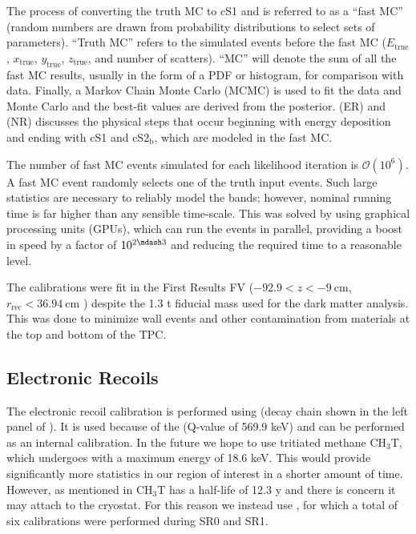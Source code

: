 The process of converting the truth MC to cS1 and \cstwob is referred to as a ``fast MC'' (random numbers are drawn from probability
distributions to select sets of parameters).  ``Truth MC'' refers to the simulated events before the fast MC ($E_{\mathrm{true}}$,
$x_{\mathrm{true}}$, $y_{\mathrm{true}}$, $z_{\mathrm{true}}$, and number
of scatters).  ``MC'' will denote the sum of all the fast MC results, usually in the form of a PDF or histogram, for
comparison with data.  Finally, a Markov Chain Monte Carlo (MCMC) is used to fit the data and Monte Carlo and the best-fit values
are derived from the posterior.   (ER) and
 (NR) discusses the physical steps that occur beginning with energy
deposition and ending with cS1 and $\mathrm{cS2_b}$, which are modeled in the fast MC.

The number of fast MC events simulated for each likelihood iteration is $\mathcal{O}(10^6)$.  A fast MC event randomly selects one of the
truth input events.  Such large statistics are necessary to reliably model the bands;
however, nominal running time is far higher than any sensible time-scale.  This was solved by using graphical processing units (GPUs),
which can run the events in parallel, providing a boost in speed by a factor of $10^{2 \mdash 3}$ and reducing the required time to a
reasonable level.

The calibrations were fit in the First Results FV ($-92.9 < z < -9\ \mathrm{cm}$, $r_{\mathrm{rec}} < 36.94\ \mathrm{cm}$
) despite the 1.3 t fiducial mass used for the dark matter analysis.  This was done to
minimize wall events and other contamination from materials at the top and bottom of the TPC.



\subsection{Electronic Recoils}
\label{subsec:er_nr_calibrations_parameter_determ_er}
The electronic recoil calibration is performed using  (decay chain shown in the left panel of
).  It is used because of the  \betadecay (Q-value of 569.9 keV) and can
be performed as an internal calibration.  In the future we hope to use tritiated methane $\mathrm{C H_3 T}$, which undergoes \betadecay
with a maximum energy of 18.6 keV.  This would provide significantly more statistics in our region of interest in a shorter amount
of time.  However, as mentioned in  $\mathrm{C H_3 T}$ has a half-life of 12.3 y and there
is concern it may attach to the cryostat.  For this reason we instead use , for which a total of six calibrations were
performed during SR0 and SR1.

